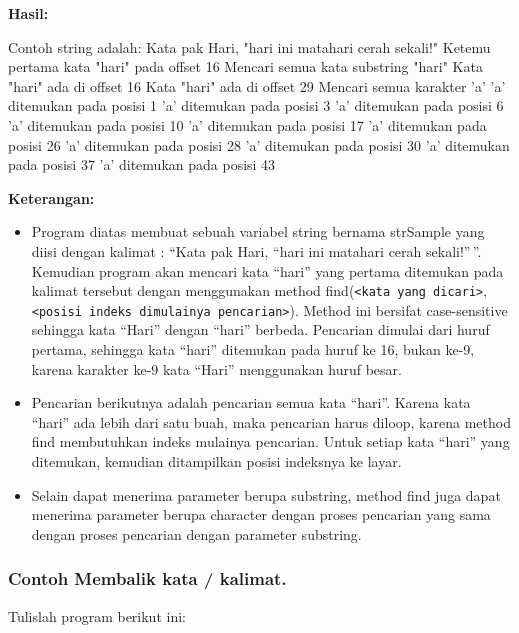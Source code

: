 \textbf{Hasil:}

\begin{lcverbatim}
Contoh string adalah:
Kata pak Hari, "hari ini matahari cerah sekali!"
Ketemu pertama kata "hari" pada offset 16
Mencari semua kata substring "hari"
Kata "hari" ada di offset 16
Kata "hari" ada di offset 29
Mencari semua karakter 'a'
'a' ditemukan pada posisi 1
'a' ditemukan pada posisi 3
'a' ditemukan pada posisi 6
'a' ditemukan pada posisi 10
'a' ditemukan pada posisi 17
'a' ditemukan pada posisi 26
'a' ditemukan pada posisi 28
'a' ditemukan pada posisi 30
'a' ditemukan pada posisi 37
'a' ditemukan pada posisi 43
\end{lcverbatim}

\textbf{Keterangan:}

\begin{itemize}

\item
  Program diatas membuat sebuah variabel string bernama strSample yang
  diisi dengan kalimat : ``Kata pak Hari, ``hari ini matahari cerah
  sekali!''\,''. Kemudian program akan mencari kata ``hari'' yang
  pertama ditemukan pada kalimat tersebut dengan menggunakan method
  find(\texttt{\textless{}kata\ yang\ dicari\textgreater{}},\texttt{\textless{}posisi\ indeks\ dimulainya\ pencarian\textgreater{}}).
  Method ini bersifat case-sensitive sehingga kata ``Hari'' dengan
  ``hari'' berbeda. Pencarian dimulai dari huruf pertama, sehingga kata
  ``hari'' ditemukan pada huruf ke 16, bukan ke-9, karena karakter ke-9
  kata ``Hari'' menggunakan huruf besar.
\item
  Pencarian berikutnya adalah pencarian semua kata ``hari''. Karena kata
  ``hari'' ada lebih dari satu buah, maka pencarian harus diloop, karena
  method find membutuhkan indeks mulainya pencarian. Untuk setiap kata
  ``hari'' yang ditemukan, kemudian ditampilkan posisi indeksnya ke
  layar.
\item
  Selain dapat menerima parameter berupa substring, method find juga
  dapat menerima parameter berupa character dengan proses pencarian yang
  sama dengan proses pencarian dengan parameter substring.
\end{itemize}

\subsubsection*{Contoh  Membalik kata / kalimat.}

Tulislah program berikut ini:


